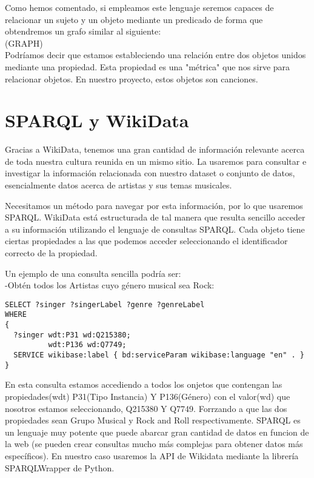 Como hemos comentado, si empleamos este lenguaje seremos capaces de relacionar un sujeto y un objeto mediante un predicado de forma que obtendremos un grafo similar al siguiente:\\

(GRAPH)\\

Podríamos decir que estamos estableciendo una relación entre dos objetos unidos mediante una propiedad. Esta propiedad es una "métrica" que nos sirve para relacionar objetos. En nuestro proyecto, estos objetos son canciones.


\section{SPARQL y WikiData}

Gracias a WikiData, tenemos una gran cantidad de información relevante acerca de toda nuestra cultura reunida en un mismo sitio. La usaremos para consultar e investigar la información relacionada con nuestro dataset o conjunto de datos, esencialmente datos acerca de artistas y sus temas musicales.

Necesitamos un método para navegar por esta información, por lo que usaremos SPARQL. WikiData está estructurada de tal manera que resulta sencillo acceder a su información utilizando el lenguaje de consultas SPARQL. Cada objeto tiene ciertas propiedades a las que podemos acceder seleccionando el identificador correcto de la propiedad.

Un ejemplo de una consulta sencilla podría ser:\\

-Obtén todos los Artistas cuyo género musical sea Rock:\\

\begin{lstlisting}[language=SPARQL]
SELECT ?singer ?singerLabel ?genre ?genreLabel
WHERE
{
  ?singer wdt:P31 wd:Q215380;
      	  wdt:P136 wd:Q7749;
  SERVICE wikibase:label { bd:serviceParam wikibase:language "en" . }
}
\end{lstlisting}

En esta consulta estamos accediendo a todos los onjetos que contengan las propiedades(wdt) P31(Tipo Instancia) Y P136(Género) con el valor(wd) que nosotros estamos seleccionando, Q215380 Y Q7749. Forrzando a que las dos propiedades sean Grupo Musical y Rock and Roll respectivamente.
SPARQL es un lenguaje muy potente que puede abarcar gran cantidad de datos en funcion de la web (se pueden crear consultas mucho más complejas para obtener datos más específicos). En nuestro caso usaremos la API de Wikidata mediante la librería SPARQLWrapper de Python.

